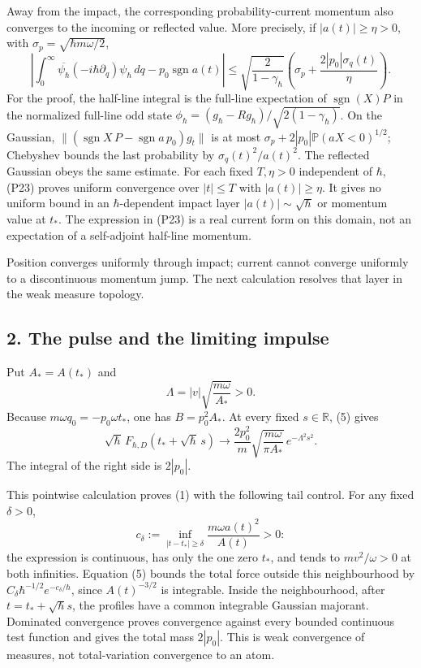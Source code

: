 \documentclass[11pt,a4paper]{article}
\begin{document}
Away from the impact, the corresponding probability-current momentum
also converges to the incoming or reflected value. More precisely, if
\(|a(t)|\ge\eta>0\), with \(\sigma_p=\sqrt{\hbar m\omega/2}\), \[
 \left|\int_0^\infty\overline{\psi_\hbar}
             (-i\hbar\partial_q)\psi_\hbar\,dq
       -p_0\operatorname{sgn}a(t)\right|
 \le\sqrt{\frac2{1-\gamma_\hbar}}
      \left(\sigma_p+\frac{2|p_0|\sigma_q(t)}{\eta}\right).\tag{P23}
\] For the proof, the half-line integral is the full-line expectation of
\(\operatorname{sgn}(X)P\) in the normalized full-line odd state
\(\phi_\hbar=(g_\hbar-Rg_\hbar)/\sqrt{2(1-\gamma_\hbar)}\). On the
Gaussian, \(\|(\operatorname{sgn}X\,P-\operatorname{sgn}a\,p_0)g_t\|\)
is at most \(\sigma_p+2|p_0|\mathbb P(aX<0)^{1/2}\); Chebyshev bounds
the last probability by \(\sigma_q(t)^2/a(t)^2\). The reflected Gaussian
obeys the same estimate. For each fixed \(T,\eta>0\) independent of
\(\hbar\), (P23) proves uniform convergence over \(|t|\le T\) with
\(|a(t)|\ge\eta\). It gives no uniform bound in an \(\hbar\)-dependent
impact layer \(|a(t)|\sim\sqrt\hbar\) or momentum value at \(t_*\). The
expression in (P23) is a real current form on this domain, not an
expectation of a self-adjoint half-line momentum.

Position converges uniformly through impact; current cannot converge
uniformly to a discontinuous momentum jump. The next calculation
resolves that layer in the weak measure topology.

\subsection{2. The pulse and the limiting
impulse}\label{the-pulse-and-the-limiting-impulse}

Put \(A_*=A(t_*)\) and
\[\Lambda=|v|\sqrt{\frac{m\omega}{A_*}}>0.\tag{6}\] Because
\(m\omega q_0=-p_0\omega t_*\), one has \(B=p_0^2A_*\). At every fixed
\(s\in\mathbb R\), (5) gives \[
 \sqrt\hbar\,F_{\hbar,D}(t_*+\sqrt\hbar\,s)
 \longrightarrow
 \frac{2p_0^2}{m}\sqrt{\frac{m\omega}{\pi A_*}}\,
          e^{-\Lambda^2s^2}.\tag{7}
\] The integral of the right side is \(2|p_0|\).

This pointwise calculation proves (1) with the following tail control.
For any fixed \(\delta>0\), \[
 c_\delta:=\inf_{|t-t_*|\ge\delta}\frac{m\omega a(t)^2}{A(t)}>0:
\] the expression is continuous, has only the one zero \(t_*\), and
tends to \(mv^2/\omega>0\) at both infinities. Equation (5) bounds the
total force outside this neighbourhood by
\(C_\delta\hbar^{-1/2}e^{-c_\delta/\hbar}\), since \(A(t)^{-3/2}\) is
integrable. Inside the neighbourhood, after \(t=t_*+\sqrt\hbar s\), the
profiles have a common integrable Gaussian majorant. Dominated
convergence proves convergence against every bounded continuous test
function and gives the total mass \(2|p_0|\). This is weak convergence
of measures, not total-variation convergence to an atom.
\end{document}
